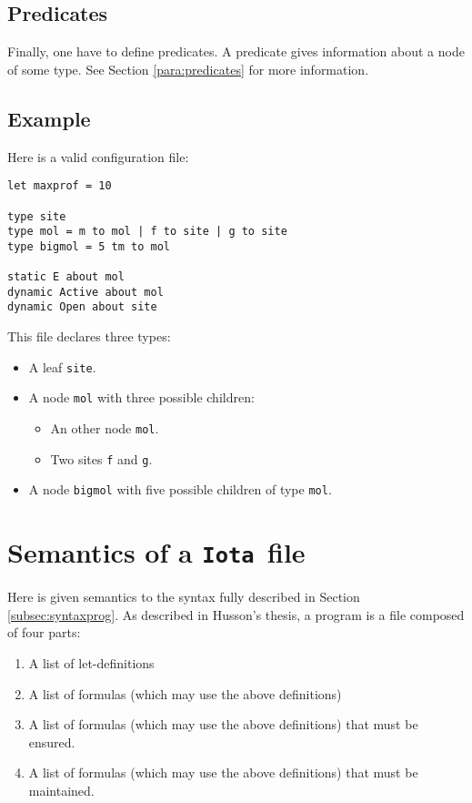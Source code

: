 \documentclass[10pt,a4paper]{article}
\newcommand{\ocaml}{\texttt}
\newcommand{\Iota}{\texttt{Iota }}
\begin{document}
\subsection{Predicates}
\label{subsec:predicates}
Finally, one have to define predicates. A predicate gives information about a node of some type. See Section \ref{para:predicates} for more information.

\subsection{Example}
Here is a valid configuration file:
\begin{verbatim}
let maxprof = 10

type site
type mol = m to mol | f to site | g to site
type bigmol = 5 tm to mol

static E about mol
dynamic Active about mol
dynamic Open about site
\end{verbatim}

This file declares three types:

\begin{itemize}
\item A leaf \ocaml{site}.
\item A node \ocaml{mol} with three possible children:
  \begin{itemize}
  \item An other node \ocaml{mol}.
  \item Two sites \ocaml{f} and \ocaml{g}.
  \end{itemize}
\item A node \ocaml{bigmol} with five possible children of type \ocaml{mol}.
\end{itemize}

\section{Semantics of a \Iota file}
Here is given semantics to the syntax fully described in Section \ref{subsec:syntaxprog}.
As described in Husson's thesis, a program is a file composed of four parts:

\begin{enumerate}
\item A list of let-definitions
\item A list of formulas (which may use the above definitions)
\item A list of formulas (which may use the above definitions) that must be ensured.
\item A list of formulas (which may use the above definitions) that must be maintained.
\end{enumerate}
\end{document}
